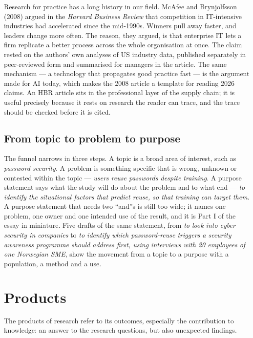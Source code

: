 \documentclass[11pt,a4paper,british,twoside=false,headings=small,chapterprefix=false,numbers=noenddot]{scrbook}
\newenvironment{block}[1]{\begin{tcolorbox}[scriptbox, title={#1}]}{\end{tcolorbox}}
\begin{document}
Research for practice has a long history in our field. McAfee and Brynjolfsson (2008) argued in the \emph{Harvard Business Review} that competition in IT-intensive industries had accelerated since the mid-1990s. Winners pull away faster, and leaders change more often. The reason, they argued, is that enterprise IT lets a firm replicate a better process across the whole organisation at once. The claim rested on the authors' own analyses of US industry data, published separately in peer-reviewed form and summarised for managers in the article. The same mechanism --- a technology that propagates good practice fast --- is the argument made for AI today, which makes the 2008 article a template for reading 2026 claims. An HBR article sits in the professional layer of the supply chain; it is useful precisely because it rests on research the reader can trace, and the trace should be checked before it is cited.

\subsection{From topic to problem to purpose}

The funnel narrows in three steps. A topic is a broad area of interest, such as \emph{password security}. A problem is something specific that is wrong, unknown or contested within the topic --- \emph{users reuse passwords despite training}. A purpose statement says what the study will do about the problem and to what end --- \emph{to identify the situational factors that predict reuse, so that training can target them}. A purpose statement that needs two ``and''s is still too wide; it names one problem, one owner and one intended use of the result, and it is Part I of the essay in miniature. Five drafts of the same statement, from \emph{to look into cyber security in companies} to \emph{to identify which password-reuse triggers a security awareness programme should address first, using interviews with 20 employees of one Norwegian SME}, show the movement from a topic to a purpose with a population, a method and a use.

\section{Products}

\begin{block}{Products}
The products of research refer to its outcomes, especially the contribution to knowledge: an answer to the research questions, but also unexpected findings.
\end{block}
\end{document}
